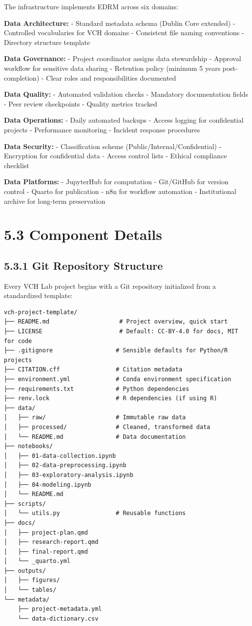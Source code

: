 \documentclass[
  oneside,
  open=any]{scrbook}
\begin{document}
The infrastructure implements EDRM across six domains:

\textbf{Data Architecture:} - Standard metadata schema (Dublin Core
extended) - Controlled vocabularies for VCH domains - Consistent file
naming conventions - Directory structure template

\textbf{Data Governance:} - Project coordinator assigns data stewardship
- Approval workflow for sensitive data sharing - Retention policy
(minimum 5 years post-completion) - Clear roles and responsibilities
documented

\textbf{Data Quality:} - Automated validation checks - Mandatory
documentation fields - Peer review checkpoints - Quality metrics tracked

\textbf{Data Operations:} - Daily automated backups - Access logging for
confidential projects - Performance monitoring - Incident response
procedures

\textbf{Data Security:} - Classification scheme
(Public/Internal/Confidential) - Encryption for confidential data -
Access control lists - Ethical compliance checklist

\textbf{Data Platforms:} - JupyterHub for computation - Git/GitHub for
version control - Quarto for publication - n8n for workflow automation -
Institutional archive for long-term preservation

\section{5.3 Component Details}\label{component-details}

\subsection{5.3.1 Git Repository
Structure}\label{git-repository-structure}

Every VCH Lab project begins with a Git repository initialized from a
standardized template:

\begin{verbatim}
vch-project-template/
├── README.md                    # Project overview, quick start
├── LICENSE                      # Default: CC-BY-4.0 for docs, MIT for code
├── .gitignore                  # Sensible defaults for Python/R projects
├── CITATION.cff                # Citation metadata
├── environment.yml             # Conda environment specification
├── requirements.txt            # Python dependencies
├── renv.lock                   # R dependencies (if using R)
├── data/
│   ├── raw/                    # Immutable raw data
│   ├── processed/              # Cleaned, transformed data
│   └── README.md               # Data documentation
├── notebooks/
│   ├── 01-data-collection.ipynb
│   ├── 02-data-preprocessing.ipynb
│   ├── 03-exploratory-analysis.ipynb
│   ├── 04-modeling.ipynb
│   └── README.md
├── scripts/
│   └── utils.py                # Reusable functions
├── docs/
│   ├── project-plan.qmd
│   ├── research-report.qmd
│   ├── final-report.qmd
│   └── _quarto.yml
├── outputs/
│   ├── figures/
│   └── tables/
└── metadata/
    ├── project-metadata.yml
    └── data-dictionary.csv
\end{verbatim}
\end{document}
